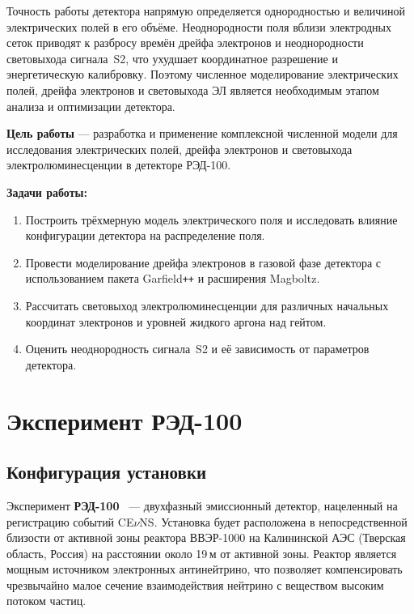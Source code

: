 \documentclass[12pt]{article}
\begin{document}
Точность работы детектора напрямую определяется однородностью и величиной
электрических полей в его объёме. Неоднородности поля вблизи электродных
сеток приводят к разбросу времён дрейфа электронов и неоднородности
световыхода сигнала~S2, что ухудшает координатное разрешение и
энергетическую калибровку. Поэтому численное моделирование электрических
полей, дрейфа электронов и световыхода ЭЛ является необходимым этапом
анализа и оптимизации детектора.

\textbf{Цель работы} — разработка и применение комплексной численной модели
для исследования электрических полей, дрейфа электронов и световыхода
электролюминесценции в детекторе РЭД-100.

\textbf{Задачи работы:}
\begin{enumerate}
  \item Построить трёхмерную модель электрического поля
        и исследовать влияние конфигурации
        детектора на распределение поля.
  \item Провести моделирование дрейфа электронов в газовой фазе детектора
        с использованием пакета Garfield\texttt{++} и расширения Magboltz.
  \item Рассчитать световыход электролюминесценции для различных начальных
        координат электронов и уровней жидкого аргона над гейтом.
  \item Оценить неоднородность сигнала~S2 и её зависимость от параметров детектора.
\end{enumerate}

\newpage
\section{Эксперимент РЭД-100}

\subsection{Конфигурация установки}

Эксперимент \textbf{РЭД-100}~\cite{Akimov2022_RED100} — двухфазный
эмиссионный детектор, нацеленный на регистрацию событий CE$\nu$NS.
Установка будет расположена в непосредственной близости от активной зоны
реактора ВВЭР-1000 на Калининской АЭС (Тверская область, Россия) на
расстоянии около 19\,м от активной зоны. Реактор является мощным
источником электронных антинейтрино, что позволяет компенсировать
чрезвычайно малое сечение взаимодействия нейтрино с веществом высоким
потоком частиц.
\end{document}
